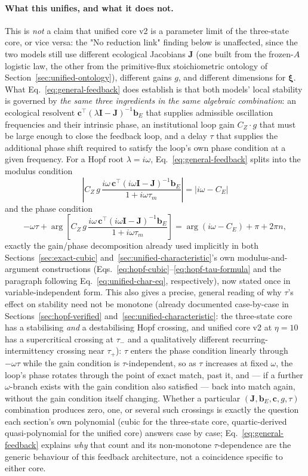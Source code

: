 \documentclass[twocolumn,10pt]{article}
\begin{document}
\paragraph{What this unifies, and what it does not.} This is \emph{not} a claim that unified core v2 is a parameter limit of the three-state core, or vice versa: the "No reduction link" finding below is unaffected, since the two models still use different ecological Jacobians $\mathbf J$ (one built from the frozen-$A$ logistic law, the other from the primitive-flux stoichiometric ontology of Section~\ref{sec:unified-ontology}), different gains $g$, and different dimensions for $\boldsymbol\xi$. What Eq.~\eqref{eq:general-feedback} does establish is that both models' local stability is governed by \emph{the same three ingredients in the same algebraic combination}: an ecological resolvent $\mathbf c^\top(\lambda\mathbf I-\mathbf J)^{-1}\mathbf b_E$ that supplies admissible oscillation frequencies and their intrinsic phase, an institutional loop gain $C_Z\cdot g$ that must be large enough to close the feedback loop, and a delay $\tau$ that supplies the additional phase shift required to satisfy the loop's own phase condition at a given frequency. For a Hopf root $\lambda=i\omega$, Eq.~\eqref{eq:general-feedback} splits into the modulus condition
\[
\left|C_Z\,g\,\frac{i\omega\,\mathbf c^\top(i\omega\mathbf I-\mathbf J)^{-1}\mathbf b_E}{1+i\omega\tau_m}\right| = |i\omega-C_E|
\]
and the phase condition
\[
-\omega\tau + \arg\!\left[C_Z\,g\,\frac{i\omega\,\mathbf c^\top(i\omega\mathbf I-\mathbf J)^{-1}\mathbf b_E}{1+i\omega\tau_m}\right] = \arg(i\omega-C_E) + \pi + 2\pi n,
\]
exactly the gain/phase decomposition already used implicitly in both Sections~\ref{sec:exact-cubic} and~\ref{sec:unified-characteristic}'s own modulus-and-argument constructions (Eqs.~\eqref{eq:hopf-cubic}--\eqref{eq:hopf-tau-formula} and the paragraph following Eq.~\eqref{eq:unified-char-eq}, respectively), now stated once in variable-independent form. This also gives a precise, general reading of why $\tau$'s effect on stability need not be monotone (already documented case-by-case in Sections~\ref{sec:hopf-verified} and~\ref{sec:unified-characteristic}: the three-state core has a stabilising \emph{and} a destabilising Hopf crossing, and unified core v2 at $\eta=10$ has a supercritical crossing at $\tau_-$ and a qualitatively different recurring-intermittency crossing near $\tau_+$): $\tau$ enters the phase condition linearly through $-\omega\tau$ while the gain condition is $\tau$-independent, so as $\tau$ increases at fixed $\omega$, the loop's phase rotates through the point of exact match, past it, and — if a further $\omega$-branch exists with the gain condition also satisfied — back into match again, without the gain condition itself changing. Whether a particular $(\mathbf J,\mathbf b_E,\mathbf c,g,\tau)$ combination produces zero, one, or several such crossings is exactly the question each section's own polynomial (cubic for the three-state core, quartic-derived quasi-polynomial for the unified core) answers case by case; Eq.~\eqref{eq:general-feedback} explains \emph{why} that count and its non-monotone $\tau$-dependence are the generic behaviour of this feedback architecture, not a coincidence specific to either core.
\end{document}
